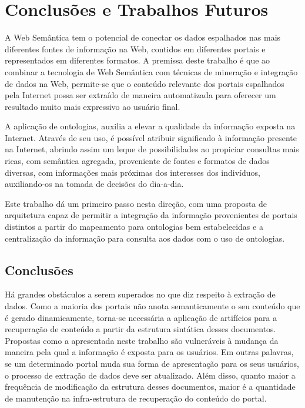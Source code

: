 \chapter{Conclusões e Trabalhos Futuros}
\label{cap:conclusoes}

A Web Semântica tem o potencial de conectar os dados espalhados nas mais diferentes fontes de informação na Web, contidos em diferentes portais e representados em diferentes formatos. A premissa deste trabalho é que ao combinar a tecnologia de Web Semântica com técnicas de mineração e integração de dados na Web, permite-se que o conteúdo relevante dos portais espalhados pela Internet possa ser extraído de maneira automatizada para oferecer um resultado muito mais expressivo ao usuário final.

A aplicação de ontologias, auxilia a elevar a qualidade da informação exposta na Internet. Através de seu uso, é possível atribuir significado à informação presente na Internet, abrindo assim um leque de possibilidades ao propiciar consultas mais ricas, com semântica agregada, proveniente de fontes e formatos de dados diversas, com informações mais próximas dos interesses dos indivíduos, auxiliando-os na tomada de decisões do dia-a-dia.

Este trabalho dá um primeiro passo nesta direção, com uma proposta de arquitetura capaz de permitir a integração da informação provenientes de portais distintos a partir do mapeamento para ontologias bem estabelecidas e a centralização da informação para consulta aos dados com o uso de ontologias. 

\section{Conclusões} 
\label{sec:consideracaoes_finais}

Há grandes obstáculos a serem superados no que diz respeito à extração de dados. Como a maioria dos portais não anota semanticamente o seu conteúdo que é gerado dinamicamente, torna-se necessária a aplicação de artifícios para a recuperação de conteúdo a partir da estrutura sintática desses documentos.  Propostas como a apresentada neste trabalho são vulneráveis à mudança da maneira pela qual a informação é exposta para os usuários. Em outras palavras, se um determinado portal muda sua forma de apresentação para os seus usuários, o processo  de extração de dados deve ser atualizado. Além disso, quanto maior a frequência de modificação da estrutura desses documentos, maior é a quantidade de manutenção na infra-estrutura de recuperação do conteúdo do portal.

